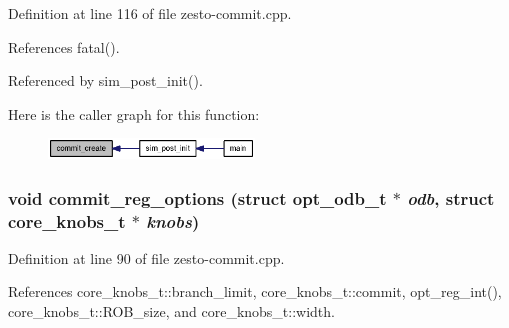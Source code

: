 Definition at line 116 of file zesto-commit.cpp.

References fatal().

Referenced by sim\_\-post\_\-init().

Here is the caller graph for this function:\nopagebreak
\begin{figure}[H]
\begin{center}
\leavevmode
\includegraphics[width=155pt]{zesto-commit_8h_6dec1ee8a7d324bb5e49bd7246608c52_icgraph}
\end{center}
\end{figure}
\subsubsection[{commit\_\-reg\_\-options}]{\setlength{\rightskip}{0pt plus 5cm}void commit\_\-reg\_\-options (struct {\bf opt\_\-odb\_\-t} $\ast$ {\em odb}, \/  struct {\bf core\_\-knobs\_\-t} $\ast$ {\em knobs})}\label{zesto-commit_8h_bf5d3f1b50f2a0e8740d65296668ced0}




Definition at line 90 of file zesto-commit.cpp.

References core\_\-knobs\_\-t::branch\_\-limit, core\_\-knobs\_\-t::commit, opt\_\-reg\_\-int(), core\_\-knobs\_\-t::ROB\_\-size, and core\_\-knobs\_\-t::width.